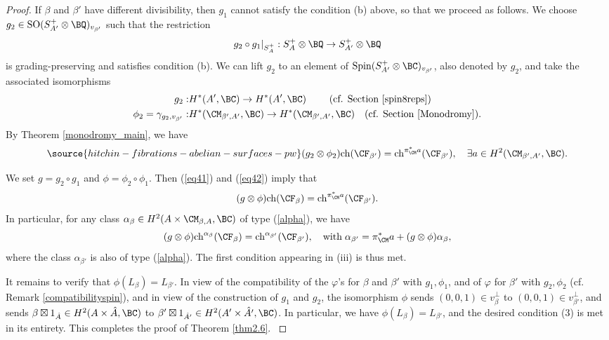 \begin{proof}
If $\beta$ and $\beta'$ have different divisibility, then $g_1$ {cannot satisfy the condition (b) above}, so that  we proceed as follows.
We choose $g_2 \in \mathrm{SO}(S_{A'}^+\otimes {\BQ})_{v_{\beta'}}$ such that the restriction
$$g_2\circ g_1|_{S_{A}^{+}}: S_{A}^{+} \otimes {\BQ} \rightarrow S_{A'}^{+}\otimes {\BQ}$$
is grading-preserving and satisfies condition (b).
We can lift $g_2$ to an element of
$\mathrm{Spin}(S_{A'}^{+}\otimes \BC)_{v_{\beta'}}$, also denoted by $g_2$, and take the associated isomorphisms
\[
\begin{split}
 g_2: &  H^*(A',\BC)  \rightarrow H^*(A',\BC) \qquad \mbox{ (cf. Section \ref{spin8reps})}
\\
\phi_2=  \gamma_{g_2,v_{\beta'}}: &   H^*(\CM_{\beta',A'},\BC)  \rightarrow H^*(\CM_{\beta',A'},\BC)
\quad
\mbox{(cf. Section \ref{Monodromy})}.
\end{split}
\]
By Theorem \ref{monodromy_main}, we have
\begin{equation}\label{eq42}
\source{hitchin-fibrations-abelian-surfaces-pw}
(g_2 \otimes \phi_2) \mathrm{ch}(\CF_{\beta'}) =  \mathrm{ch}^{\pi_\CM^*a}(\CF_{\beta'}), \quad {\exists} a \in H^2(\CM_{\beta',A'}, \BC).
\end{equation}

We set $g = g_2 \circ g_1$ and $\phi = \phi_2\circ \phi_1$.
Then  (\ref{eq41}) and (\ref{eq42}) imply that
\[
(g\otimes \phi)\mathrm{ch}(\CF_{\beta}) = \mathrm{ch}^{\pi_\CM^*a}(\CF_{\beta'}).
\]
In particular, for any class $\alpha_\beta \in H^2(A\times \CM_{\beta,A}, \BC)$ of type (\ref{alpha}), we have
\[
(g\otimes \phi)\mathrm{ch}^{\alpha_\beta}(\CF_{\beta}) = \mathrm{ch}^{\alpha_{\beta'}}(\CF_{\beta'}), \quad {\rm with}\; \alpha_{\beta'} = \pi_\CM^*a+ (g\otimes \phi)\alpha_\beta,
\]
where the class $\alpha_{\beta'}$ is also of type (\ref{alpha}). {The first condition appearing in (iii) is thus met.}

{It remains to verify that $\phi (L_\beta)=L_{\beta'}$.
In view of  the compatibility of the $\varphi$'s for $\beta$ and $\beta'$ with $g_1, \phi_1$, and of $\varphi$ for $\beta'$ with $g_2, \phi_2$ (cf. Remark \ref{compatibilityspin}), and in view  of the construction of $g_1$ and $g_2$,
the isomorphism $\phi$  sends $(0,0,1) \in v_\beta^\perp$ to $(0,0,1) \in v_{\beta'}^\perp$, and sends $\beta\boxtimes 1_{\hat{A}} \in H^2(A\times \hat{A}, \BC)$ to $\beta' \boxtimes 1_{\hat{A'}} \in H^2(A'\times \hat{A'}, \BC)$. In particular, we have
$
\phi(L_\beta) = L_{\beta'}
$, and the desired condition (3) is met in its entirety.
This completes the proof of Theorem \ref{thm2.6}. }
\end{proof}

